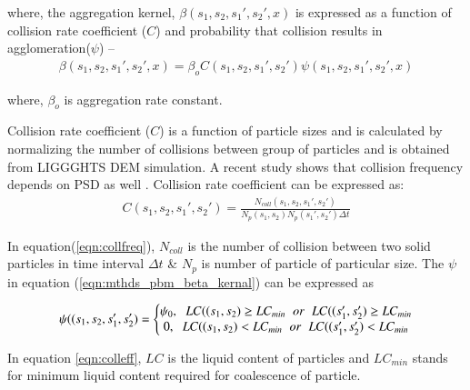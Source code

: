 \documentclass[preprint,11pt,authoryear]{elsarticle}
\begin{document}
\par where, the aggregation kernel, $\beta(s_1,s_2, s_1',s_2',x)$ is expressed as a function of collision 
rate coefficient ($C$) and probability that collision results in agglomeration($\psi$) \citep{ingram2005} 
–
\begin{align}
\beta(s_1,s_2,s_1',s_2',x) = \beta_oC(s_1,s_2,s_1',s_2')\psi(s_1,s_2,s_1',s_2',x)
\label{eqn:mthds_pbm_beta_kernal}
\end{align}

where, $\beta_o$ is aggregation rate constant.
\par Collision rate coefficient ($C$) is a function of particle sizes and is calculated by normalizing the 
number of collisions between group of particles \citep{gantt2006} and is obtained from LIGGGHTS 
DEM simulation. A recent study shows that collision frequency depends on PSD as well 
\citep{sen2014}. Collision rate coefficient can be expressed as:
\begin{align}
C(s_1,s_2,s_1',s_2')=\frac{N_{coll}(s_1,s_2,s_1',s_2')}{N_p(s_1,s_2)N_p(s_1',s_2')\Delta t}
\label{eqn:collfreq}
\end{align}
\par In equation(\ref{eqn:collfreq}), $N_{coll}$ is the number of collision between two solid particles in 
time interval $\Delta t$ \& $N_p$ is number of particle of particular size. The $\psi$ in equation 
(\ref{eqn:mthds_pbm_beta_kernal}) can be expressed as 

\begin{align}
\psi((s_1,s_2,s_1',s_2') = 
\left\{\begin{matrix}
\psi_0,\hspace{0.2cm} LC((s_1,s_2) \geq LC_{min}\hspace{0.2cm} or\hspace{0.2cm} LC((s_1',s_2') \geq LC_{min}	\\ 
0,\hspace{0.2cm} LC((s_1,s_2) < LC_{min}\hspace{0.2cm} or\hspace{0.2cm} LC((s_1',s_2') < LC_{min}
\end{matrix}\right.
\label{eqn:colleff}
\end{align}
\par In equation \ref{eqn:colleff}, $LC$ is the liquid content of particles and $LC_{min}$ stands for minimum liquid content required for coalescence of particle. 
\end{document}
